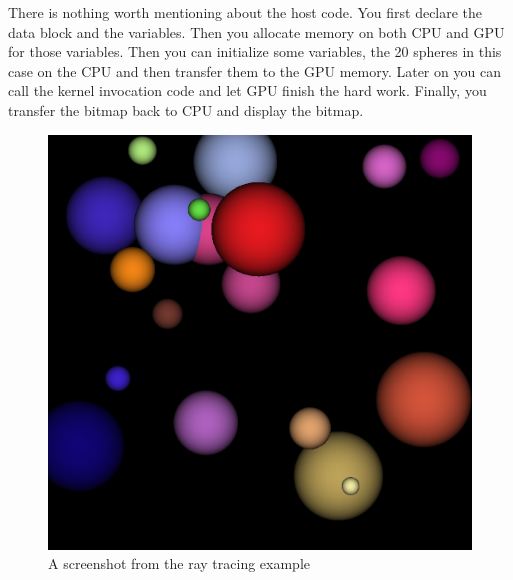 \documentclass[letterpaper,10pt,openany,oneside]{sphinxmanual}
\begin{document}
There is nothing worth mentioning about the host code. You first declare the data block and the variables. Then you allocate memory on both CPU and GPU for those variables. Then you can initialize some variables, the 20 spheres in this case on the CPU and then transfer them to the GPU memory. Later on you can call the kernel invocation code and let GPU finish the hard work. Finally, you transfer the bitmap back to CPU and display the bitmap.
\begin{figure}[htbp]
\centering
\capstart

\includegraphics{RayTracing.png}
\caption{A screenshot from the ray tracing example}\end{figure}
\end{document}
